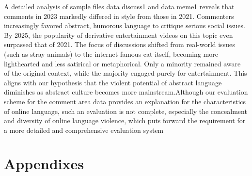 \documentclass[12pt,a4paper]{ctexart}
\begin{document}
A detailed analysis of sample files data discuss1 and data meme1 reveals that comments in 2023 markedly differed in style from those in 2021. Commenters increasingly favored abstract, humorous language to critique serious social issues. By 2025, the popularity of derivative entertainment videos on this topic even surpassed that of 2021. The focus of discussions shifted from real-world issues (such as stray animals) to the internet-famous cat itself, becoming more lighthearted and less satirical or metaphorical. Only a minority remained aware of the original context, while the majority engaged purely for entertainment. This aligns with our hypothesis that the violent potential of abstract language diminishes as abstract culture becomes more mainstream.Although our evaluation scheme for the comment area data provides an explanation for the characteristics of online language, such an evaluation is not complete, especially the concealment and diversity of online language violence, which puts forward the requirement for a more detailed and comprehensive evaluation system

\section{Appendixes}
\end{document}
